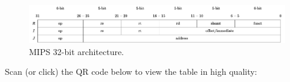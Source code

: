 \begin{figure}[!htp]
    \centering
    \includegraphics[width=\textwidth]{img/mips-arch.pdf}
    \caption{MIPS 32-bit architecture.}
\end{figure}

\noindent
Scan (or click) the QR code below to view the table in high quality:
\begin{center}
\end{center}

\newpage

